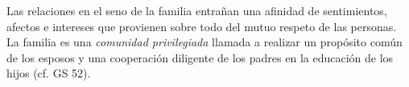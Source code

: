 	 Las relaciones en el seno de la familia entrañan una afinidad de sentimientos, afectos e intereses que provienen sobre todo del mutuo respeto de las personas. La familia es una \emph{comunidad privilegiada} llamada a realizar un propósito común de los esposos y una cooperación diligente de los padres en la educación de los hijos (cf. GS 52).